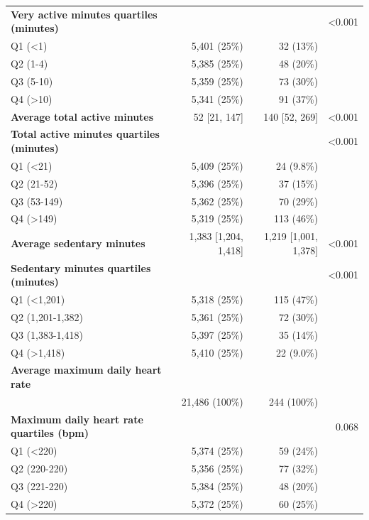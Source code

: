 \documentclass[11pt]{article}
\begin{document}
\begin{longtable}{@{}p{6.4cm}rrr@{}}
\textbf{Very active minutes quartiles (minutes)} &  &  & <0.001 \\
\quad Q1 (<1) & 5,401 (25\%) & 32 (13\%) &  \\
\quad Q2 (1-4) & 5,385 (25\%) & 48 (20\%) &  \\
\quad Q3 (5-10) & 5,359 (25\%) & 73 (30\%) &  \\
\quad Q4 (>10) & 5,341 (25\%) & 91 (37\%) &  \\
\textbf{Average total active minutes} & 52 [21, 147] & 140 [52, 269] & <0.001 \\
\textbf{Total active minutes quartiles (minutes)} &  &  & <0.001 \\
\quad Q1 (<21) & 5,409 (25\%) & 24 (9.8\%) &  \\
\quad Q2 (21-52) & 5,396 (25\%) & 37 (15\%) &  \\
\quad Q3 (53-149) & 5,362 (25\%) & 70 (29\%) &  \\
\quad Q4 (>149) & 5,319 (25\%) & 113 (46\%) &  \\
\textbf{Average sedentary minutes} & 1,383 [1,204, 1,418] & 1,219 [1,001, 1,378] & <0.001 \\
\textbf{Sedentary minutes quartiles (minutes)} &  &  & <0.001 \\
\quad Q1 (<1,201) & 5,318 (25\%) & 115 (47\%) &  \\
\quad Q2 (1,201-1,382) & 5,361 (25\%) & 72 (30\%) &  \\
\quad Q3 (1,383-1,418) & 5,397 (25\%) & 35 (14\%) &  \\
\quad Q4 (>1,418) & 5,410 (25\%) & 22 (9.0\%) &  \\
\textbf{Average maximum daily heart rate} &  &  &  \\
\quad 220 & 21,486 (100\%) & 244 (100\%) &  \\
\textbf{Maximum daily heart rate quartiles (bpm)} &  &  & 0.068 \\
\quad Q1 (<220) & 5,374 (25\%) & 59 (24\%) &  \\
\quad Q2 (220-220) & 5,356 (25\%) & 77 (32\%) &  \\
\quad Q3 (221-220) & 5,384 (25\%) & 48 (20\%) &  \\
\quad Q4 (>220) & 5,372 (25\%) & 60 (25\%) &  \\
\bottomrule \end{longtable}\normalsize
\end{document}
